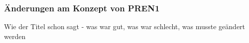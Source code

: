 \documentclass[main.tex]{subfiles} %
\begin{document}

\subsubsection{Änderungen am Konzept von PREN1}

Wie der Titel schon sagt - was war gut, was war schlecht, was musste geändert
werden
\end{document}
